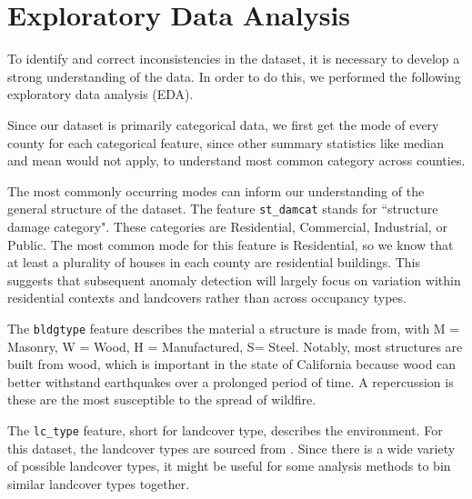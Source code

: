 \documentclass[11pt,letterpaper]{article}
\begin{document}
\begin{table}[htbp]
\caption{Features in the Dataset (sourced from \citep{TechnicalDocumentation})}
\label{tab:features}
\resizebox{0.9\linewidth}{!}{}
\end{table}

\newpage

\section{Exploratory Data Analysis}

To identify and correct inconsistencies in the dataset, it is necessary to develop a strong understanding of the data. In order to do this, we performed the following exploratory data analysis (EDA). 

Since our dataset is primarily categorical data, we first get the mode of every county for each categorical feature, since other summary statistics like median and mean would not apply, to understand most common category across counties.

\begin{table}[htbp]
\caption{Modes of Categorical Features by County (first 5 rows)}
\resizebox{0.65\linewidth}{!}{}
\end{table}

The most commonly occurring modes can inform our understanding of the general structure of the dataset. The feature \texttt{st\_damcat} stands for ``structure damage category". These categories are Residential, Commercial, Industrial, or Public. The most common mode for this feature is Residential, so we know that at least a plurality of houses in each county are residential buildings. This suggests that subsequent anomaly detection will largely focus on variation within residential contexts and landcovers rather than across occupancy types.

The \texttt{bldgtype} feature describes the material a structure is made from, with M = Masonry, W = Wood, H = Manufactured, S= Steel. Notably, most structures are built from wood, which is important in the state of California because wood can better withstand earthquakes over a prolonged period of time. A repercussion is these are the most susceptible to the spread of wildfire.

The \texttt{lc\_type} feature, short for landcover type, describes the environment. For this dataset, the landcover types are sourced from \cite{OvertureMaps}. Since there is a wide variety of possible landcover types, it might be useful for some analysis methods to bin similar landcover types together. 
\end{document}
